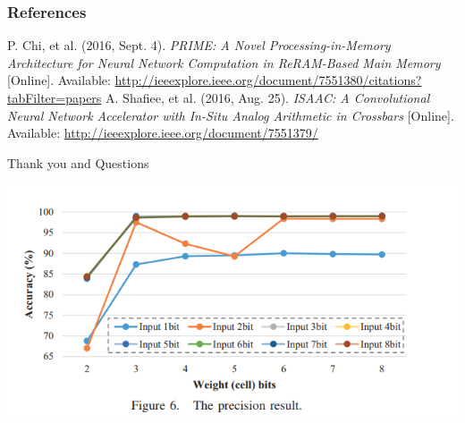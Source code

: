 \documentclass[hyperref={colorlinks}]{beamer}
\begin{document}
\begin{frame}
	\frametitle{References}
	\footnotesize{
		\begin{thebibliography}{9} %
			P. Chi, et al. (2016, Sept. 4).
			\emph{PRIME: A Novel Processing-in-Memory Architecture for Neural Network Computation in ReRAM-Based Main Memory} [Online].
			Available: \url{http://ieeexplore.ieee.org/document/7551380/citations?tabFilter=papers}
			A. Shafiee, et al. (2016, Aug. 25).
			\emph{ISAAC: A Convolutional Neural Network Accelerator with In-Situ Analog Arithmetic in Crossbars} [Online].
			Available: \url{http://ieeexplore.ieee.org/document/7551379/}
		\end{thebibliography}
	}
\end{frame}

\begin{frame}
	\Huge{\centerline{Thank you and Questions}}
\end{frame}

\begin{frame}
	\includegraphics[scale=0.4]{precision_graph.png}
\end{frame}
\end{document}
